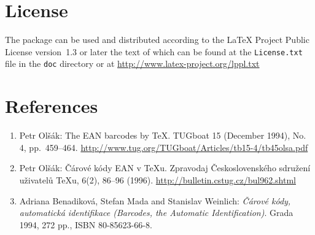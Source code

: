 \documentclass[11pt]{article}
\begin{document}
\section{License}
The package can be used and distributed according to the LaTeX Project Public License version~1.3 or later the
text of which can be found at the \texttt{License.txt} file in the \texttt{doc} directory or at
\url{http://www.latex-project.org/lppl.txt}

\section{References}
\begin{enumerate}
\item Petr Olšák: The EAN barcodes by \TeX. TUGboat 15 (December 1994), No. 4, pp.~459--464.
\url{http://www.tug.org/TUGboat/Articles/tb15-4/tb45olsa.pdf}

\item Petr Olšák: Čárové kódy EAN v \TeX{}u. Zpravodaj Československého sdružení uživatelů \TeX{}u,
6(2), 86--96 (1996). \url{http://bulletin.cstug.cz/bul962.shtml}

\item Adriana Benadiková, Stefan Mada and Stanislav
Weinlich: \textit{Čárové kódy, automatická iden\-ti\-fi\-kace (Barcodes, the Automatic Identification)}.
Grada 1994, 272 pp., ISBN \hbox{80-85623-66-8}.
\end{enumerate}
\end{document}
